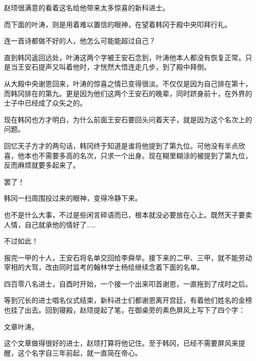 赵顼很满意的看着这名给他带来太多惊喜的新科进士。

而下面的叶涛，则是用着难以置信的眼神，在望着韩冈于殿中央叩拜行礼。

连一首诗都做不好的人，他怎么可能能超过自己？

直到韩冈返回远处，叶涛这两个字被王安石念到，叶涛他本人都没有恢复正常。只是当王安石提声又叫着他时，才恍然大悟连走几步，到了殿中拜倒。

从大殿中央谢恩回来，叶涛的惊喜之情已变得很淡。不仅仅是因为自己排在第十，而韩冈排在的第九。更是因为他们这两个王安石的晚辈，同时跻身前十，在外界的士子中已经成了众矢之的。

现在韩冈也方才明白，为什么前面王安石要回头问着天子，就是因为这个名次上的问题。

回忆天子方才的两句话，韩冈终于知道是谁将他提到了第九位。可他没有半点欣喜，他本也不需要多高的名次，只求一个出身。现在糊里糊涂的被提到了第九位，反而麻烦就要多起来了。

罢了！

韩冈一扫周围投过来的眼神，变得冷静下来。

也不是什么大事，不过是些闲言碎语而已，根本就没必要放在心上。既然天子要卖人情，自己就承他的情好了……

不过如此！

报完一甲的十人，王安石将名单交回给李舜举。接下来的二甲、三甲，就不能劳动宰相的大驾，改由同时监考的翰林学士杨绘继续念着下面的名单。

四百零八名进士，自酉时开始，一个接一个出来叩首谢恩，一直拖到了戌时之后。

等到冗长的进士唱名仪式结束，新科进士们都谢恩离开宫廷，有着他们姓名的金榜也挂了出去。回到寝殿，赵顼提起了笔，在御桌旁的素色屏风上写下了四个字：

文章叶涛。

这个文章做得很好的进士，赵顼打算将他记住。至于韩冈，已经不需要屏风来提醒，这个名字自三年前起，就一直简在帝心。

